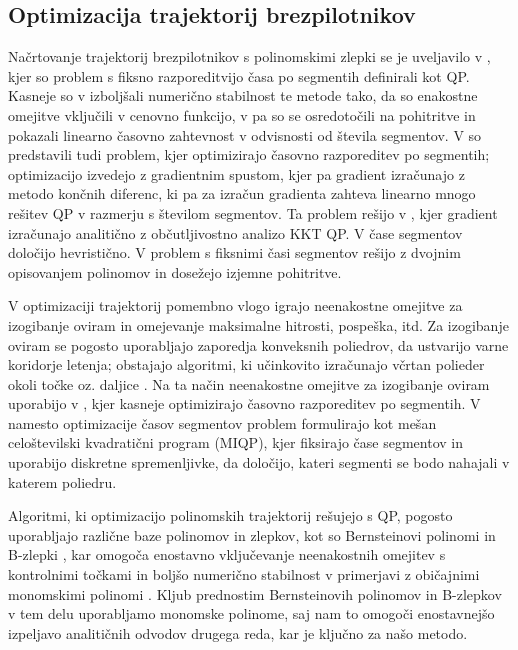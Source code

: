 \documentclass[isrm2, tisk]{fmfdelo}
\begin{document}
\subsection{Optimizacija trajektorij brezpilotnikov}
Načrtovanje trajektorij brezpilotnikov s polinomskimi zlepki se je uveljavilo v \cite{mellinger2011minimum}, kjer so problem s fiksno razporeditvijo časa po segmentih definirali kot \ac{QP}. Kasneje so v \cite{richter2016polynomial} izboljšali numerično stabilnost te metode tako, da so enakostne omejitve vključili v cenovno funkcijo, v \cite{burke2020generating} pa so se osredotočili na pohitritve in pokazali linearno časovno zahtevnost v odvisnosti od števila segmentov. V \cite{mellinger2011minimum} so predstavili tudi problem, kjer optimizirajo časovno razporeditev po segmentih; optimizacijo izvedejo z gradientnim spustom, kjer pa gradient izračunajo z metodo končnih diferenc, ki pa za izračun gradienta zahteva linearno mnogo rešitev \ac{QP} v razmerju s številom segmentov. Ta problem rešijo v \cite{sun2021fast}, kjer gradient izračunajo analitično z občutljivostno analizo \ac{KKT} \ac{QP}. V \cite{gao2018online} čase segmentov določijo hevristično. V \cite{wang2021generating} problem s fiksnimi časi segmentov rešijo z dvojnim opisovanjem polinomov in dosežejo izjemne pohitritve.

V optimizaciji trajektorij pomembno vlogo igrajo neenakostne omejitve za izogibanje oviram in omejevanje maksimalne hitrosti, pospeška, itd. Za izogibanje oviram se pogosto uporabljajo zaporedja konveksnih poliedrov, da ustvarijo varne koridorje letenja; obstajajo algoritmi, ki učinkovito izračunajo včrtan polieder okoli točke \cite{deits2015computing} oz. daljice \cite{liu2017planning}. Na ta način neenakostne omejitve za izogibanje oviram uporabijo v \cite{sun2021fast}, kjer kasneje optimizirajo časovno razporeditev po segmentih. V \cite{tordesillas2021faster} namesto optimizacije časov segmentov problem formulirajo kot mešan celoštevilski kvadratični program (MIQP), kjer fiksirajo čase segmentov in uporabijo diskretne spremenljivke, da določijo, kateri segmenti se bodo nahajali v katerem poliedru.

Algoritmi, ki optimizacijo polinomskih trajektorij rešujejo s \ac{QP}, pogosto uporabljajo različne baze polinomov in zlepkov, kot so Bernsteinovi polinomi \cite{sun2021fast, tordesillas2021faster} in B-zlepki \cite{zhou2020ego}, kar omogoča enostavno vključevanje neenakostnih omejitev s kontrolnimi točkami in boljšo numerično stabilnost v primerjavi z običajnimi monomskimi polinomi \cite{runge1901}. Kljub prednostim Bernsteinovih polinomov in B-zlepkov v tem delu uporabljamo monomske polinome, saj nam to omogoči enostavnejšo izpeljavo analitičnih odvodov drugega reda, kar je ključno za našo metodo.
\end{document}
